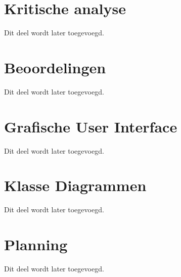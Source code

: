 \documentclass[12pt,a4paper]{report}
\begin{document}
\chapter{Kritische analyse}

Dit deel wordt later toegevoegd.

\appendix

\chapter{Beoordelingen}

Dit deel wordt later toegevoegd.

\chapter{Grafische User Interface}

Dit deel wordt later toegevoegd.

\chapter{Klasse Diagrammen}

Dit deel wordt later toegevoegd.

\chapter{Planning}
\label{appendix:planning}

Dit deel wordt later toegevoegd.

\end{document}
